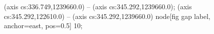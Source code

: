  (axis cs:336.749,1239660.0) -- (axis cs:345.292,1239660.0);
 (axis cs:345.292,122610.0) -- (axis cs:345.292,1239660.0)
  node[fig gap label, anchor=east, pos=0.5] {\texttimes{}10};
